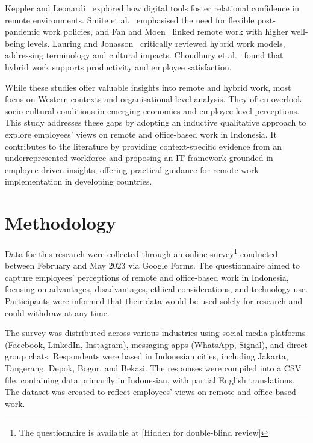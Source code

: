 \documentclass[a4paper, conference]{IEEEtran}
\begin{document}
Keppler and Leonardi~\cite{Keppler2023RelationalConfidence} explored how digital tools foster relational confidence in remote environments. Smite et al.~\cite{Smite2023WFHFlexibility} emphasised the need for flexible post-pandemic work policies, and Fan and Moen~\cite{Fan2023SubjectiveWellbeing} linked remote work with higher well-being levels. Lauring and Jonasson~\cite{Lauring2024Hybrid} critically reviewed hybrid work models, addressing terminology and cultural impacts. Choudhury et al.~\cite{Choudhury2024Hybrid} found that hybrid work supports productivity and employee satisfaction.

While these studies offer valuable insights into remote and hybrid work, most focus on Western contexts and organisational-level analysis. They often overlook socio-cultural conditions in emerging economies and employee-level perceptions. This study addresses these gaps by adopting an inductive qualitative approach to explore employees’ views on remote and office-based work in Indonesia. It contributes to the literature by providing context-specific evidence from an underrepresented workforce and proposing an IT framework grounded in employee-driven insights, offering practical guidance for remote work implementation in developing countries.



\section{Methodology}
\label{sec:methodology}

Data for this research were collected through an online survey\footnote{The questionnaire is available at 
	[Hidden for double-blind review]
} conducted between February and May 2023 via Google Forms. The questionnaire aimed to capture employees' perceptions of remote and office-based work in Indonesia, focusing on advantages, disadvantages, ethical considerations, and technology use. Participants were informed that their data would be used solely for research and could withdraw at any time.

The survey was distributed across various industries using social media platforms (Facebook, LinkedIn, Instagram), messaging apps (WhatsApp, Signal), and direct group chats. Respondents were based in Indonesian cities, including Jakarta, Tangerang, Depok, Bogor, and Bekasi. The responses were compiled into a CSV file, containing data primarily in Indonesian, with partial English translations. The dataset was created to reflect employees' views on remote and office-based work.
\end{document}
